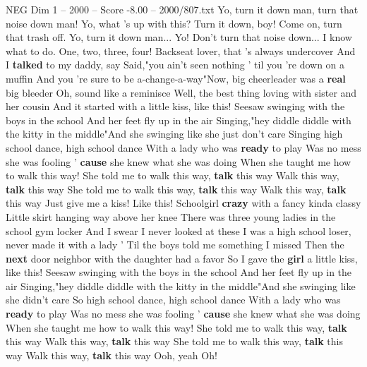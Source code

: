 \begin{textsample}{NEG Dim 1 – 2000 – Score -8.00 – 2000/807.txt}  \label{ex:f1_neg_016}
Yo, turn it down man, turn that noise down man!
Yo, what 's up with this?
Turn it down, boy!
Come on, turn that trash off.
Yo, turn it down man...
Yo!
Don't turn that noise down...
I know what to do.
One, two, three, four!
Backseat lover, that 's always undercover And I \textbf{talked} to my daddy, say Said,"you ain't seen nothing ' til you 're down on a muffin And you 're sure to be a-change-a-way"Now, big cheerleader was a \textbf{real} big bleeder Oh, sound like a reminisce Well, the best thing loving with sister and her cousin And it started with a little kiss, like this!
Seesaw swinging with the boys in the school And her feet fly up in the air Singing,"hey diddle diddle with the kitty in the middle"And she swinging like she just don't care Singing high school dance, high school dance With a lady who was \textbf{ready} to play Was no mess she was fooling ' \textbf{cause} she knew what she was doing When she taught me how to walk this way!
She told me to walk this way, \textbf{talk} this way Walk this way, \textbf{talk} this way She told me to walk this way, \textbf{talk} this way Walk this way, \textbf{talk} this way Just give me a kiss!
Like this!
Schoolgirl \textbf{crazy} with a fancy kinda classy Little skirt hanging way above her knee There was three young ladies in the school gym locker And I swear I never looked at these I was a high school loser, never made it with a lady ' Til the boys told me something I missed Then the \textbf{next} door neighbor with the daughter had a favor So I gave the \textbf{girl} a little kiss, like this!
Seesaw swinging with the boys in the school And her feet fly up in the air Singing,"hey diddle diddle with the kitty in the middle"And she swinging like she didn't care So high school dance, high school dance With a lady who was \textbf{ready} to play Was no mess she was fooling ' \textbf{cause} she knew what she was doing When she taught me how to walk this way!
She told me to walk this way, \textbf{talk} this way Walk this way, \textbf{talk} this way She told me to walk this way, \textbf{talk} this way Walk this way, \textbf{talk} this way Ooh, yeah Oh!

\end{textsample}
